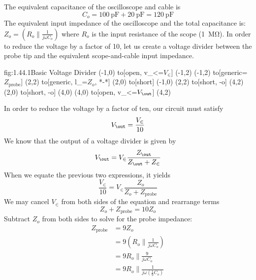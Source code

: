 





The equivalent capacitance of the oscilloscope and cable is
\[ C_o = \SI{100}{\pico\farad} + \SI{20}{\pico\farad} =  \SI{120}{\pico\farad}\]
The equivalent input impedance of the oscilloscope and the total capacitance is:
$Z_o = \left( R_o \parallel \frac{1}{j\omega C_o} \right)$
where $R_o$ is the input resistance of the scope (\SI{1}{\mega\ohm}).
In order to reduce the voltage by a factor of 10, let us create a voltage divider between the probe tip and the equivalent scope-and-cable input impedance.
\begin{circuit}{fig:1.44.1}{Basic Voltage Divider}
    (-1,0) to[open, v_<=$V_\in$] (-1,2)
    (-1,2) to[generic=$Z_{\text{probe}}$] (2,2)
    to[generic, l_=$Z_o$, *-*] (2,0)
    to[short] (-1,0)
    (2,2)  to[short, -o] (4,2)
    (2,0) to[short, -o] (4,0)
    (4,0) to[open, v_<=$V_\out$] (4,2)
\end{circuit}
In order to reduce the voltage by a factor of ten, our circuit must satisfy
\[V_{\out} = \frac{V_{\in}}{10}\]
We know that the output of a voltage divider is given by
\[V_{\out} = V_{\in}\frac{Z_{\out}}{Z_{\out} + Z_{\in}}\]
When we equate the previous two expressions, it yields
\[\frac{V_{\in}}{10} = V_{\in}\frac{Z_o}{Z_o + Z_{\text{probe}}}\]
We may cancel $V_{\in}$ from both sides of the equation and rearrange terms
\[Z_o + Z_{\text{probe}} = 10 Z_o\]
Subtract $Z_o$ from both sides to solve for the probe impedance:
\begin{align*}
    Z_{\text{probe}} &= 9 Z_o \\
    &= 9 \left( R_o \parallel \frac{1}{ j\omega C_o } \right) \\
    &= 9 R_o \parallel \frac{9}{ j\omega C_o } \\
    &= 9 R_o \parallel \frac{1}{ j\omega \left( \frac{1}{9} C_o \right) }
\end{align*}

